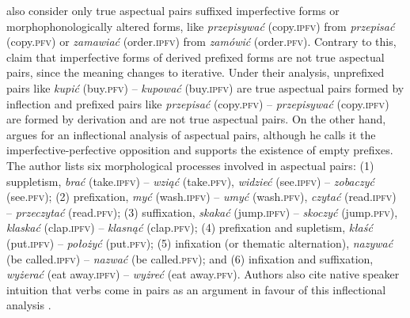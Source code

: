 \documentclass[12pt]{article}
\newcommand{\ita}[1]{\textit{#1}}
\begin{document}
\textcite{wlodarczyk2006SemanticStructuresAspect} also consider only true aspectual pairs suffixed imperfective forms or morphophonologically altered forms, like \textit{przepisywać} (copy.\textsc{ipfv}) from \textit{przepisać} (copy.\textsc{pfv}) or \textit{zamawiać} (order.\textsc{ipfv}) from \textit{zamówić} (order.\textsc{pfv}). Contrary to this, \textcite{grzegorczykowa1999Morfologia} claim that imperfective forms of derived prefixed forms are not true aspectual pairs, since the meaning changes to iterative. Under their analysis, unprefixed pairs like \textit{kupić} (buy.\textsc{pfv}) -- \textit{kupować} (buy.\textsc{ipfv}) are true aspectual pairs formed by inflection and prefixed pairs like \textit{przepisać} (copy.\textsc{pfv}) -- \textit{przepisywać} (copy.\textsc{ipfv}) are formed by derivation and are not true aspectual pairs. On the other hand, \textcite{perlin2005IleJestAspektow} argues for an inflectional analysis of aspectual pairs, although he calls it the imperfective-perfective opposition and supports the existence of empty prefixes. The author lists six morphological processes involved in aspectual pairs: (1) suppletism, \textit{brać} (take.\textsc{ipfv}) -- \textit{wziąć} (take.\textsc{pfv}), \textit{widzieć} (see.\textsc{ipfv}) -- \ita{zobaczyć} (see.\textsc{pfv}); (2) prefixation, \ita{myć} (wash.\textsc{ipfv}) -- \ita{umyć} (wash.\textsc{pfv}), \ita{czytać} (read.\textsc{ipfv}) -- \ita{przeczytać} (read.\textsc{pfv}); (3) suffixation, \ita{skakać} (jump.\textsc{ipfv}) -- \ita{skoczyć} (jump.\textsc{pfv}), \ita{klaskać} (clap.\textsc{ipfv}) -- \ita{klasnąć} (clap.\textsc{pfv}); (4) prefixation and supletism, \ita{kłaść} (put.\textsc{ipfv}) -- \ita{położyć} (put.\textsc{pfv}); (5) infixation (or thematic alternation), \ita{nazywać} (be called.\textsc{ipfv}) -- \ita{nazwać} (be called.\textsc{pfv}); and (6) infixation and suffixation, \ita{wyżerać} (eat away.\textsc{ipfv}) -- \ita{wyżreć} (eat away.\textsc{pfv}). Authors also cite native speaker intuition that verbs come in pairs as an argument in favour of this inflectional analysis \parencite{mlynarczyk2004AspectualPairingPolish,perlin2005IleJestAspektow}.
\end{document}
